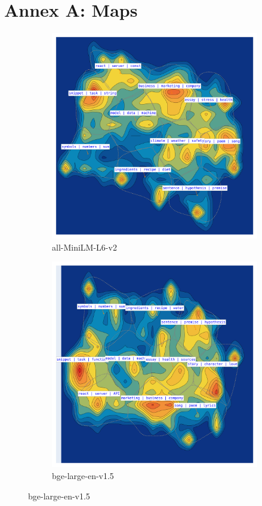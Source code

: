 \documentclass{article}
\begin{document}
\section*{Annex A: Maps}
\begin{figure}
 \begin{subfigure}{0.49\textwidth}
     \centering
     \includegraphics[width=\linewidth]{img/maps/all-MiniLM-L6-v2plot.png}
     \caption{all-MiniLM-L6-v2}
     \label{fig:a}
 \end{subfigure}
 \hfill
 \begin{subfigure}{0.49\textwidth}
     \centering
     \includegraphics[width=\linewidth]{img/maps/bge-large-en-v1.5plot.png}
     \caption{bge-large-en-v1.5}
     \label{fig:b}
 \end{subfigure}
 

\end{figure}
\end{document}
